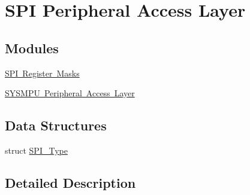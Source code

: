 \hypertarget{group___s_p_i___peripheral___access___layer}{}\section{S\+PI Peripheral Access Layer}
\label{group___s_p_i___peripheral___access___layer}
\subsection*{Modules}
\begin{DoxyCompactItemize}
\item 
\mbox{\hyperlink{group___s_p_i___register___masks}{S\+P\+I Register Masks}}
\item 
\mbox{\hyperlink{group___s_y_s_m_p_u___peripheral___access___layer}{S\+Y\+S\+M\+P\+U Peripheral Access Layer}}
\end{DoxyCompactItemize}
\subsection*{Data Structures}
\begin{DoxyCompactItemize}
\item 
struct \mbox{\hyperlink{struct_s_p_i___type}{S\+P\+I\+\_\+\+Type}}
\end{DoxyCompactItemize}


\subsection{Detailed Description}

